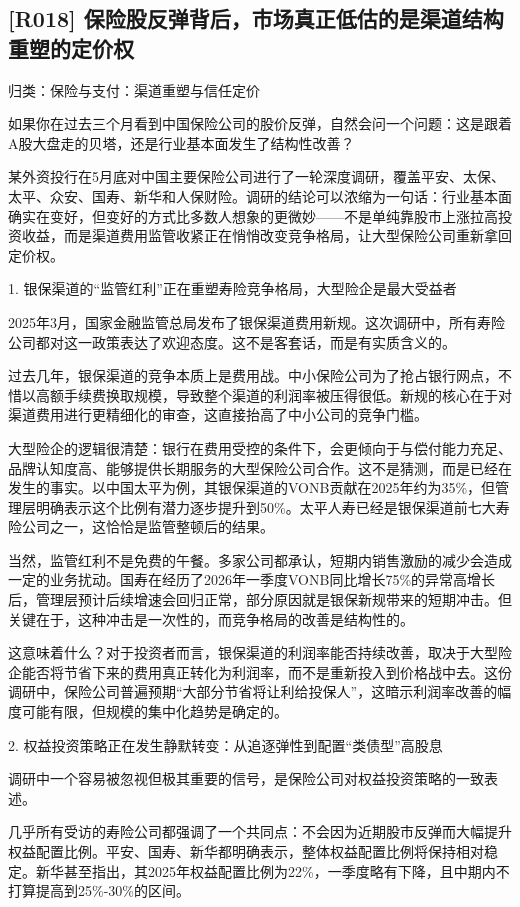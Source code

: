 \documentclass[11pt]{ctexart}
\begin{document}
\subsection{[R018] 保险股反弹背后，市场真正低估的是渠道结构重塑的定价权}
{\small\color{refgray}归类：保险与支付：渠道重塑与信任定价}

如果你在过去三个月看到中国保险公司的股价反弹，自然会问一个问题：这是跟着A股大盘走的贝塔，还是行业基本面发生了结构性改善？

某外资投行在5月底对中国主要保险公司进行了一轮深度调研，覆盖平安、太保、太平、众安、国寿、新华和人保财险。调研的结论可以浓缩为一句话：行业基本面确实在变好，但变好的方式比多数人想象的更微妙——不是单纯靠股市上涨拉高投资收益，而是渠道费用监管收紧正在悄悄改变竞争格局，让大型保险公司重新拿回定价权。

1. 银保渠道的“监管红利”正在重塑寿险竞争格局，大型险企是最大受益者

2025年3月，国家金融监管总局发布了银保渠道费用新规。这次调研中，所有寿险公司都对这一政策表达了欢迎态度。这不是客套话，而是有实质含义的。

过去几年，银保渠道的竞争本质上是费用战。中小保险公司为了抢占银行网点，不惜以高额手续费换取规模，导致整个渠道的利润率被压得很低。新规的核心在于对渠道费用进行更精细化的审查，这直接抬高了中小公司的竞争门槛。

大型险企的逻辑很清楚：银行在费用受控的条件下，会更倾向于与偿付能力充足、品牌认知度高、能够提供长期服务的大型保险公司合作。这不是猜测，而是已经在发生的事实。以中国太平为例，其银保渠道的VONB贡献在2025年约为35\%，但管理层明确表示这个比例有潜力逐步提升到50\%。太平人寿已经是银保渠道前七大寿险公司之一，这恰恰是监管整顿后的结果。

当然，监管红利不是免费的午餐。多家公司都承认，短期内销售激励的减少会造成一定的业务扰动。国寿在经历了2026年一季度VONB同比增长75\%的异常高增长后，管理层预计后续增速会回归正常，部分原因就是银保新规带来的短期冲击。但关键在于，这种冲击是一次性的，而竞争格局的改善是结构性的。

这意味着什么？对于投资者而言，银保渠道的利润率能否持续改善，取决于大型险企能否将节省下来的费用真正转化为利润率，而不是重新投入到价格战中去。这份调研中，保险公司普遍预期“大部分节省将让利给投保人”，这暗示利润率改善的幅度可能有限，但规模的集中化趋势是确定的。

2. 权益投资策略正在发生静默转变：从追逐弹性到配置“类债型”高股息

调研中一个容易被忽视但极其重要的信号，是保险公司对权益投资策略的一致表述。

几乎所有受访的寿险公司都强调了一个共同点：不会因为近期股市反弹而大幅提升权益配置比例。平安、国寿、新华都明确表示，整体权益配置比例将保持相对稳定。新华甚至指出，其2025年权益配置比例为22\%，一季度略有下降，且中期内不打算提高到25\%-30\%的区间。
\end{document}
